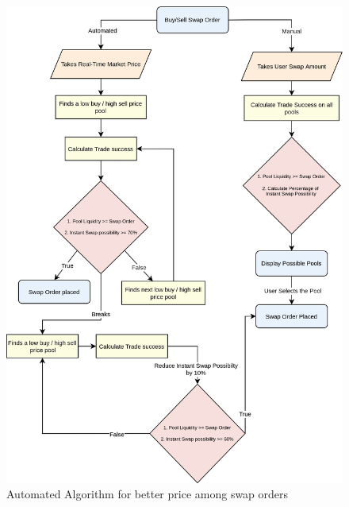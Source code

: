 \documentclass[conference]{IEEEtran}
\begin{document}
\begin{figure}
\begin{center}
\includegraphics[width=11.5cm]{dex-algorithm}
\caption{Automated Algorithm for better price among swap orders}
\end{center}
\end{figure}
\end{document}
